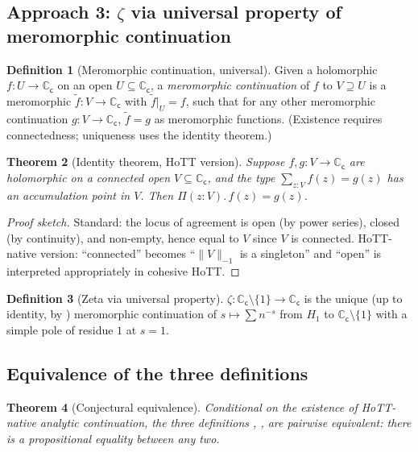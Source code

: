\documentclass[12pt]{article}
\newtheorem{theorem}{Theorem}[section]
\theoremstyle{definition}
\newtheorem{definition}[theorem]{Definition}
\theoremstyle{remark}
\newcommand{\C}{\mathbb{C}}
\newcommand{\Cc}{\C_{\mathsf{c}}}
\begin{document}
\subsection{Approach 3: \texorpdfstring{$\zeta$}{zeta} via universal property of meromorphic continuation}

\begin{definition}[Meromorphic continuation, universal]\label{def:MeromCont}
Given a holomorphic $f:U \to \Cc$ on an open $U \subseteq \Cc$, a
\emph{meromorphic continuation} of $f$ to $V \supseteq U$ is a
meromorphic $\tilde f:V \to \Cc$ with $\tilde f|_U = f$, such that for any
other meromorphic continuation $g:V \to \Cc$, $\tilde f = g$ as meromorphic
functions. (Existence requires connectedness; uniqueness uses the identity
theorem.)
\end{definition}

\begin{theorem}[Identity theorem, HoTT version]\label{thm:Identity}
Suppose $f, g:V \to \Cc$ are holomorphic on a connected open $V \subseteq \Cc$,
and the type $\sum_{z:V} f(z) = g(z)$ has an accumulation point in $V$.
Then $\Pi(z:V).\, f(z) = g(z)$.
\end{theorem}

\begin{proof}[Proof sketch]
Standard: the locus of agreement is open (by power series), closed (by
continuity), and non-empty, hence equal to $V$ since $V$ is connected.
HoTT-native version: ``connected'' becomes ``$\|V\|_{-1}$ is a singleton''
and ``open'' is interpreted appropriately in cohesive HoTT.
\end{proof}

\begin{definition}[Zeta via universal property]\label{def:ZetaUP}
$\zeta:\Cc \setminus \{1\} \to \Cc$ is the unique (up to identity, by
) meromorphic continuation of $s \mapsto \sum n^{-s}$ from
$H_1$ to $\Cc \setminus \{1\}$ with a simple pole of residue $1$ at $s=1$.
\end{definition}

\subsection{Equivalence of the three definitions}

\begin{theorem}[Conjectural equivalence]\label{thm:ZetaEquiv}
Conditional on the existence of HoTT-native analytic continuation, the three
definitions , , 
are pairwise equivalent: there is a propositional equality between any two.
\end{theorem}
\end{document}
